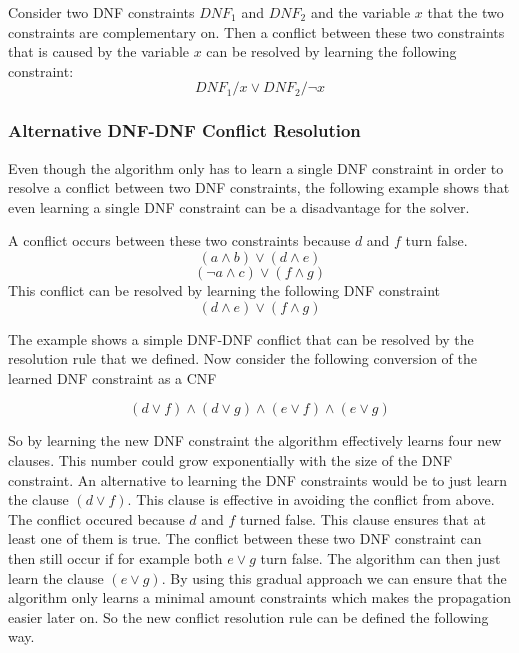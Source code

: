 \begin{leftbar}
Consider two DNF constraints $DNF_1$ and $DNF_2$ and the variable $x$ that the two constraints are complementary on. Then a conflict between these two constraints that is caused by the variable $x$ can be resolved by learning the following constraint:
\begin{displaymath}
DNF_1 / x \vee DNF_2 / \neg x
\end{displaymath}
\end{leftbar}

\subsubsection{Alternative DNF-DNF Conflict Resolution}

Even though the algorithm only has to learn a single DNF constraint in order to resolve a conflict between two DNF constraints, the following example shows that even learning a single DNF constraint can be a disadvantage for the solver.

\begin{leftbar}
A conflict occurs between these two constraints because $d$ and $f$ turn false.
\begin{displaymath}
(a \wedge b) \vee (d \wedge e)
\end{displaymath}
\begin{displaymath}
(\neg a \wedge c) \vee (f \wedge g)
\end{displaymath}
This conflict can be resolved by learning the following DNF constraint
\begin{displaymath}
(d \wedge e) \vee (f \wedge g)
\end{displaymath}
\end{leftbar}

The example shows a simple DNF-DNF conflict that can be resolved by the resolution rule that we defined. Now consider the following conversion of the learned DNF constraint as a CNF

\begin{leftbar}
\begin{displaymath}
(d \vee f) \wedge (d \vee g) \wedge (e \vee f) \wedge (e \vee g)
\end{displaymath}
\end{leftbar}

So by learning the new DNF constraint the algorithm effectively learns four new clauses. This number could grow exponentially with the size of the DNF constraint. An alternative to learning the DNF constraints would be to just learn the clause $(d \vee f)$. This clause is effective in avoiding the conflict from above. The conflict occured because $d$ and $f$ turned false. This clause ensures that at least one of them is true. The conflict between these two DNF constraint can then still occur if for example both $e \vee g$ turn false. The algorithm can then just learn the clause $(e \vee g)$. By using this gradual approach we can ensure that the algorithm only learns a minimal amount constraints which makes the propagation easier later on. So the new conflict resolution rule can be defined the following way.

